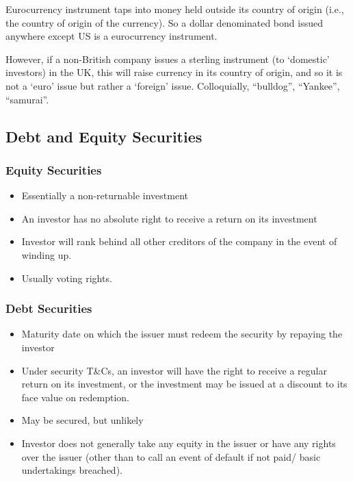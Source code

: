 \documentclass[
]{article}
\providecommand{\tightlist}{%
  \setlength{\itemsep}{0pt}\setlength{\parskip}{0pt}}
\begin{document}
Eurocurrency instrument taps into money held outside its country of
origin (i.e., the country of origin of the currency). So a dollar
denominated bond issued anywhere except US is a eurocurrency instrument.

However, if a non-British company issues a sterling instrument (to
`domestic' investors) in the UK, this will raise currency in its country
of origin, and so it is not a `euro' issue but rather a `foreign' issue.
Colloquially, ``bulldog'', ``Yankee'', ``samurai''.

\hypertarget{debt-and-equity-securities}{%
\subsection{Debt and Equity
Securities}\label{debt-and-equity-securities}}

\hypertarget{equity-securities}{%
\subsubsection{Equity Securities}\label{equity-securities}}

\begin{itemize}
\tightlist
\item
  Essentially a non-returnable investment
\item
  An investor has no absolute right to receive a return on its
  investment
\item
  Investor will rank behind all other creditors of the company in the
  event of winding up.
\item
  Usually voting rights.
\end{itemize}

\hypertarget{debt-securities}{%
\subsubsection{Debt Securities}\label{debt-securities}}

\begin{itemize}
\tightlist
\item
  Maturity date on which the issuer must redeem the security by repaying
  the investor
\item
  Under security T\&Cs, an investor will have the right to receive a
  regular return on its investment, or the investment may be issued at a
  discount to its face value on redemption.
\item
  May be secured, but unlikely
\item
  Investor does not generally take any equity in the issuer or have any
  rights over the issuer (other than to call an event of default if not
  paid/ basic undertakings breached).
\end{itemize}
\end{document}
